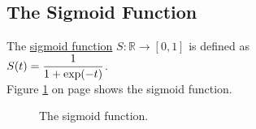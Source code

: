 \subsection{The Sigmoid Function}
\begin{Definition}
The \href{https://en.wikipedia.org/wiki/Sigmoid_function}{sigmoid function} $S: \mathbb{R} \rightarrow [0, 1]$ is defined as 
\\[0.2cm]
\hspace*{1.3cm}
$\displaystyle S(t) = \frac{1}{1 + \exp(-t)}$.  
\\[0.2cm]
Figure \ref{fig:sigmoid.eps} on page \pageref{fig:sigmoid.eps} shows the sigmoid function.
\eox
\end{Definition}

\begin{figure}[!ht]
\centering
{}
\vspace*{-0.3cm}
\caption{The sigmoid function.}
\label{fig:sigmoid.eps}
\end{figure}


